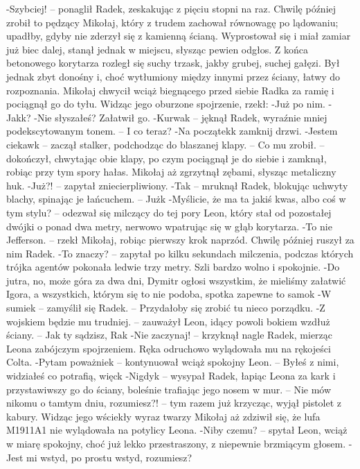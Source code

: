 \documentclass[../MAIN.tex]{subfiles}
\begin{document}
-Szybciej! -- ponaglił Radek, zeskakując z pięciu stopni na raz. Chwilę później zrobił to pędzący Mikołaj, który z trudem zachował równowagę po lądowaniu; upadłby, gdyby nie zderzył się z kamienną ścianą. Wyprostował się i miał zamiar już biec dalej, stanął jednak w miejscu, słysząc pewien odgłos.
Z końca betonowego korytarza rozległ się suchy trzask, jakby grubej, suchej gałęzi. Był jednak zbyt donośny i, choć wytłumiony między innymi przez ściany, łatwy do rozpoznania.
Mikołaj chwycił wciąż biegnącego przed siebie Radka za ramię i pociągnął go do tyłu. Widząc jego oburzone spojrzenie, rzekł:
-Już po nim.
-Jak\3k?
-Nie słyszałeś? Załatwił go.
-Kurwa\3k -- jęknął Radek, wyraźnie mniej podekscytowanym tonem. -- I co teraz?
-Na początek\3k zamknij drzwi.
-Jestem ciekaw\3k -- zaczął stalker, podchodząc do blaszanej klapy. -- Co mu zrobił. -- dokończył, chwytając obie klapy, po czym pociągnął je do siebie i zamknął, robiąc przy tym spory hałas. Mikołaj aż zgrzytnął zębami, słysząc metaliczny huk.
-Już?! -- zapytał zniecierpliwiony.
-Ta\3k -- mruknął Radek, blokując uchwyty blachy, spinając je łańcuchem. -- Już\3k
-Myślicie, że ma ta jakiś kwas, albo coś w tym stylu? -- odezwał się milczący do tej pory Leon, który stał od pozostałej dwójki o ponad dwa metry, nerwowo wpatrując się w głąb korytarza.
-To nie Jefferson. -- rzekł Mikołaj, robiąc pierwszy krok naprzód. Chwilę później ruszył za nim Radek.
-To znaczy? -- zapytał po kilku sekundach milczenia, podczas których trójka agentów pokonała ledwie trzy metry. Szli bardzo wolno i spokojnie.
-Do jutra, no, może góra za dwa dni, Dymitr ogłosi wszystkim, że mieliśmy załatwić Igora, a wszystkich, którym się to nie podoba, spotka zapewne to samo\3k
-W sumie\3k -- zamyślił się Radek. -- Przydałoby się zrobić tu nieco porządku.
-Z wojskiem będzie mu trudniej. -- zauważył Leon, idący powoli bokiem wzdłuż ściany. -- Jak ty sądzisz, Ra\3k
-Nie zaczynaj! -- krzyknął nagle Radek, mierząc Leona zabójczym spojrzeniem. Ręka odruchowo wylądowała mu na rękojeści Colta.
-Pytam poważnie\3k -- kontynuował wciąż spokojny Leon. -- Byłeś z nimi, widziałeś co potrafią, więc\3k
-Nigdy\3k -- wysypał Radek, łapiąc Leona za kark i przystawiwszy go do ściany, boleśnie trafiając jego nosem w mur. -- Nie mów nikomu o tamtym dniu, rozumiesz?! -- tym razem już krzycząc, wyjął pistolet z kabury. Widząc jego wściekły wyraz twarzy Mikołaj aż zdziwił się, że lufa M1911A1 nie wylądowała na potylicy Leona.
-Niby czemu? -- spytał Leon, wciąż w miarę spokojny, choć już lekko przestraszony, z niepewnie brzmiącym głosem.
-Jest mi wstyd, po prostu wstyd, rozumiesz?
\end{document}
